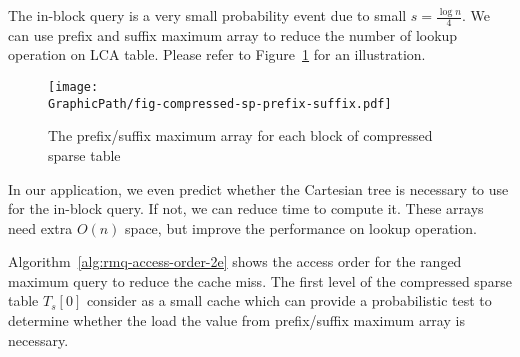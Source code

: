 \iffalse
在 VGLCS 問題中，平行區間詢問的每個區間範圍都是已知的，每一個會重複使用好幾次，
由於已知詢問的區間資訊，我們可以藉由建表範圍縮小，
從算法 \ref{alg:reduce-boundary} 推導邊界來減少計算量。
\fi



The in-block query is a very small probability event due to small $s =
\frac{\log n}{4}$. We can use prefix and suffix maximum array to reduce
the number of lookup operation on LCA table.  Please refer to
Figure~\ref{fig:compressed-sp-opt} for an illustration.

\begin{figure}[!thb]
  \centering
  \texttt{[image: \\GraphicPath/fig-compressed-sp-prefix-suffix.pdf]}
  \caption{The prefix/suffix maximum array for each block of compressed sparse table}
  \label{fig:compressed-sp-opt}
\end{figure}

In our application, we even predict whether the Cartesian tree is
necessary to use for the in-block query. If not, we can reduce time to
compute it. These arrays need extra $O(n)$ space, but improve the
performance on lookup operation.  

Algorithm~\ref{alg:rmq-access-order-2e} shows the access order for the
ranged maximum query to reduce the cache miss.  The first level of the
compressed sparse table $T_s[0]$ consider as a small cache which can
provide a probabilistic test to determine whether the load the value
from prefix/suffix maximum array is necessary.


